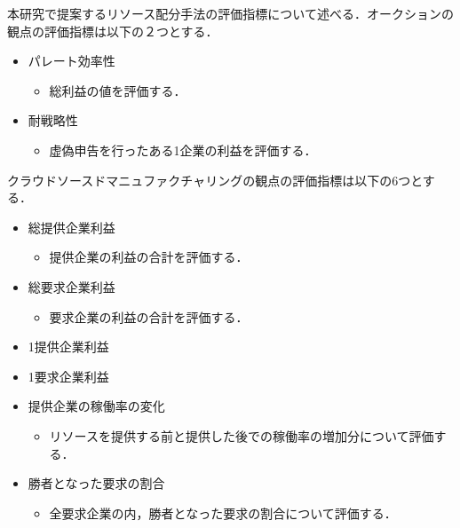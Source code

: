 本研究で提案するリソース配分手法の評価指標について述べる．オークションの観点の評価指標は以下の２つとする．

\begin{itemize}
\tightlist
\item
  パレート効率性

  \begin{itemize}
  \tightlist
  \item
    総利益の値を評価する．
  \end{itemize}
\item
  耐戦略性

  \begin{itemize}
  \tightlist
  \item
    虚偽申告を行ったある1企業の利益を評価する．
  \end{itemize}
\end{itemize}

クラウドソースドマニュファクチャリングの観点の評価指標は以下の6つとする．

\begin{itemize}
\tightlist
\item
  総提供企業利益

  \begin{itemize}
  \tightlist
  \item
    提供企業の利益の合計を評価する．
  \end{itemize}
\item
  総要求企業利益

  \begin{itemize}
  \tightlist
  \item
    要求企業の利益の合計を評価する．
  \end{itemize}
\item
  1提供企業利益
\item
  1要求企業利益
\item
  提供企業の稼働率の変化

  \begin{itemize}
  \tightlist
  \item
    リソースを提供する前と提供した後での稼働率の増加分について評価する．
  \end{itemize}
\item
  勝者となった要求の割合

  \begin{itemize}
  \tightlist
  \item
    全要求企業の内，勝者となった要求の割合について評価する．
  \end{itemize}
\end{itemize}

